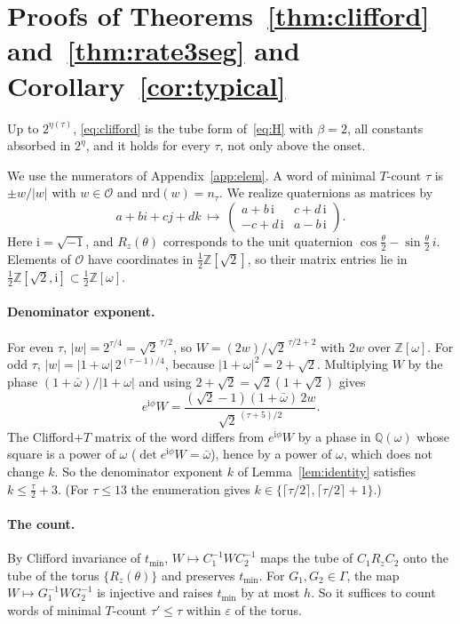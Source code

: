 \documentclass[aps,prx,twocolumn,superscriptaddress,nofootinbib,longbibliography]{revtex4-2}
\theoremstyle{plain}
\theoremstyle{definition}
\theoremstyle{remark}
\newcommand{\Z}{\mathbb{Z}}
\newcommand{\Q}{\mathbb{Q}}
\begin{document}
\section{Proofs of Theorems~\ref{thm:clifford} and~\ref{thm:rate3seg} and Corollary~\ref{cor:typical}}\label{app:clifford}

Up to $2^{\eta(\tau)}$, \eqref{eq:clifford} is the tube form of~\eqref{eq:H} with $\beta=2$, all constants absorbed in $2^\eta$, and it holds for every $\tau$, not only above the onset.

We use the numerators of Appendix~\ref{app:elem}. A word of minimal $T$-count $\tau$ is $\pm w/|w|$ with $w\in\mathcal O$ and $\mathrm{nrd}(w)=n_\tau$. We realize quaternions as matrices by
\[
a+bi+cj+dk\ \mapsto\ \begin{pmatrix}a+b\,\mathrm i&c+d\,\mathrm i\\-c+d\,\mathrm i&a-b\,\mathrm i\end{pmatrix}.
\]
Here $\mathrm i=\sqrt{-1}$, and $R_z(\theta)$ corresponds to the unit quaternion $\cos\tfrac\theta2-\sin\tfrac\theta2\,i$. Elements of $\mathcal O$ have coordinates in $\tfrac12\Z[\sqrt2]$, so their matrix entries lie in $\tfrac12\Z[\sqrt2,\mathrm i]\subset\tfrac12\Z[\omega]$.

\paragraph{Denominator exponent.} For even $\tau$, $|w|=2^{\tau/4}=\sqrt2^{\,\tau/2}$, so $W=(2w)/\sqrt2^{\,\tau/2+2}$ with $2w$ over $\Z[\omega]$. For odd $\tau$, $|w|=|1+\omega|\,2^{(\tau-1)/4}$, because $|1+\omega|^2=2+\sqrt2$. Multiplying $W$ by the phase $(1+\bar\omega)/|1+\omega|$ and using $2+\sqrt2=\sqrt2(1+\sqrt2)$ gives
\[
e^{\mathrm i\phi}W=\frac{(\sqrt2-1)(1+\bar\omega)\,2w}{\sqrt2^{\,(\tau+5)/2}} .
\]
The Clifford+$T$ matrix of the word differs from $e^{\mathrm i\phi}W$ by a phase in $\Q(\omega)$ whose square is a power of $\omega$ ($\det e^{\mathrm i\phi}W=\bar\omega$), hence by a power of $\omega$, which does not change $k$. So the denominator exponent $k$ of Lemma~\ref{lem:identity} satisfies $k\le\tfrac\tau2+3$. (For $\tau\le13$ the enumeration gives $k\in\{\lceil\tau/2\rceil,\lceil\tau/2\rceil+1\}$.)

\paragraph{The count.} By Clifford invariance of $t_{\min}$, $W\mapsto C_1^{-1}WC_2^{-1}$ maps the tube of $C_1R_zC_2$ onto the tube of the torus $\{R_z(\theta)\}$ and preserves $t_{\min}$. For $G_1,G_2\in\Gamma$, the map $W\mapsto G_1^{-1}WG_2^{-1}$ is injective and raises $t_{\min}$ by at most $h$. So it suffices to count words of minimal $T$-count $\tau'\le\tau$ within $\varepsilon$ of the torus.
\end{document}
